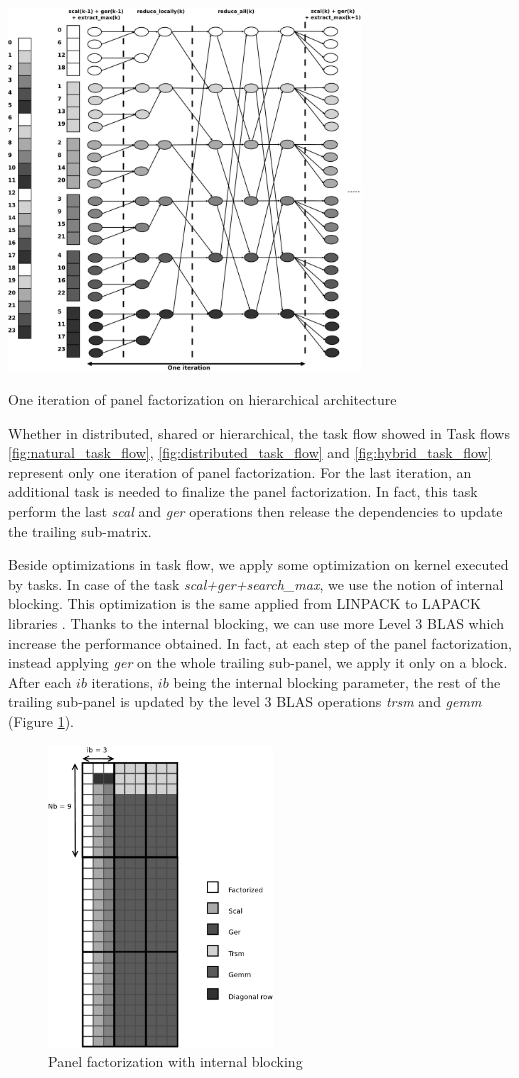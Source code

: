\begin{taskflow}[!ht]
\centering
\includegraphics[width=0.7\textwidth]{figures/hybrid_tf_bw.pdf}
\caption{One iteration of panel factorization on hierarchical architecture \label{fig:hybrid_task_flow}}
\end{taskflow}
 
Whether in distributed, shared or hierarchical, the task flow showed in Task flows \ref{fig:natural_task_flow}, \ref{fig:distributed_task_flow} and \ref{fig:hybrid_task_flow} represent only one iteration of panel factorization. For the last iteration, an additional task is needed to finalize the panel factorization. In fact, this task perform the last \emph{scal} and \emph{ger} operations then release the dependencies to update the trailing sub-matrix.

Beside optimizations in task flow, we apply some optimization on kernel executed by tasks. In case of the task \textit{scal+ger+search\_max}, we use the notion of internal blocking. This optimization is the same applied from LINPACK to LAPACK libraries \cite{Anderson:1990:LPL}. Thanks to the internal blocking, we can use more Level 3 BLAS which increase the performance obtained. In fact, at each step of the panel factorization, instead applying \emph{ger} on the whole trailing sub-panel, we apply it only on a block. After each $ib$ iterations, $ib$ being the internal blocking parameter, the rest of the trailing sub-panel is updated by the level 3 BLAS operations \emph{trsm} and \emph{gemm} (Figure \ref{fig:panel_ib}).

\begin{figure}[!ht]
\centering
\includegraphics[height=8cm]{figures/panel_ib_bw.pdf}
\caption{Panel factorization with internal blocking\label{fig:panel_ib}}
\end{figure}
